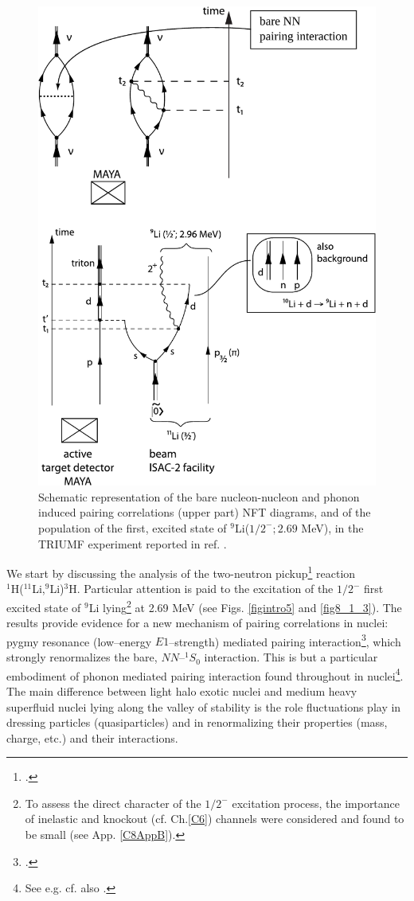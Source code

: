  \begin{figure}
 \centerline{\includegraphics*[width=12cm,angle=0]{C8/figsC8/fig8_1_1}}
 	\caption{Schematic representation of the bare nucleon-nucleon and phonon induced pairing correlations (upper part) NFT diagrams, and of the population of the first, excited state of $^{9}$Li($1/2^{-}; 2.69$ MeV), in the TRIUMF experiment  reported in ref. \cite{Tanihata:08}.}\label{fig8_1_1}
 \end{figure}
 We start by discussing  the analysis of the two-neutron pickup\footnote{\cite{Tanihata:08}.} reaction\\ $^1$H($^{11}$Li,$^9$Li)$^3$H. Particular  attention is paid to the  excitation of the $1/2^-$ first excited state of $^9$Li lying\footnote{To assess the direct character of the $1/2^-$ excitation process, the importance of inelastic  and knockout (cf. Ch.\ref{C6}) channels were considered and found to be small (see App. \ref{C8AppB}).} at 2.69 MeV (see Figs. \ref{figintro5} and  \ref{fig8_1_3}). The results  provide evidence for a new mechanism of pairing correlations in nuclei: pygmy resonance (low--energy $E1$--strength) mediated pairing interaction\footnote{\citet{Barranco:01,Potel:10}.}, which strongly renormalizes the bare, $NN$--$^1S_0$ interaction. This is but a particular embodiment of phonon mediated pairing interaction found throughout in nuclei\footnote{See e.g. \citet{Barranco:99,Gori:04} cf. also \citet{Brink:05}.}. The main difference between light halo exotic nuclei and medium heavy superfluid nuclei lying along the valley of stability is the role fluctuations play in dressing particles (quasiparticles) and in renormalizing their properties (mass, charge, etc.) and their interactions.
